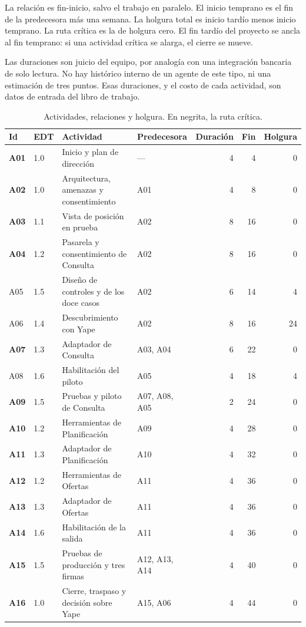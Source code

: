 \documentclass[11pt,a4paper]{article}
\begin{document}
La relación es fin-inicio, salvo el trabajo en paralelo. El inicio temprano es el fin de la predecesora más una semana. La holgura total es inicio tardío menos inicio temprano. La ruta crítica es la de holgura cero. El fin tardío del proyecto se ancla al fin temprano: si una actividad crítica se alarga, el cierre se mueve.

Las duraciones son juicio del equipo, por analogía con una integración bancaria de solo lectura. No hay histórico interno de un agente de este tipo, ni una estimación de tres puntos. Esas duraciones, y el costo de cada actividad, son datos de entrada del libro de trabajo.

\begin{table}[H]
\centering
\caption{Actividades, relaciones y holgura. En negrita, la ruta crítica.}
\footnotesize
\setlength{\tabcolsep}{3.5pt}
\begin{tabularx}{\textwidth}{@{}l l X l r r r@{}}
\toprule
\textbf{Id} & \textbf{EDT} & \textbf{Actividad} & \textbf{Predecesora} & \textbf{Duración} & \textbf{Fin} & \textbf{Holgura} \\
\midrule
\textbf{A01} & 1.0 & Inicio y plan de dirección & --- & 4 & 4 & 0 \\
\textbf{A02} & 1.0 & Arquitectura, amenazas y consentimiento & A01 & 4 & 8 & 0 \\
\textbf{A03} & 1.1 & Vista de posición en prueba & A02 & 8 & 16 & 0 \\
\textbf{A04} & 1.2 & Pasarela y consentimiento de Consulta & A02 & 8 & 16 & 0 \\
A05 & 1.5 & Diseño de controles y de los doce casos & A02 & 6 & 14 & 4 \\
A06 & 1.4 & Descubrimiento con Yape & A02 & 8 & 16 & 24 \\
\textbf{A07} & 1.3 & Adaptador de Consulta & A03, A04 & 6 & 22 & 0 \\
A08 & 1.6 & Habilitación del piloto & A05 & 4 & 18 & 4 \\
\textbf{A09} & 1.5 & Pruebas y piloto de Consulta & A07, A08, A05 & 2 & 24 & 0 \\
\textbf{A10} & 1.2 & Herramientas de Planificación & A09 & 4 & 28 & 0 \\
\textbf{A11} & 1.3 & Adaptador de Planificación & A10 & 4 & 32 & 0 \\
\textbf{A12} & 1.2 & Herramientas de Ofertas & A11 & 4 & 36 & 0 \\
\textbf{A13} & 1.3 & Adaptador de Ofertas & A11 & 4 & 36 & 0 \\
\textbf{A14} & 1.6 & Habilitación de la salida & A11 & 4 & 36 & 0 \\
\textbf{A15} & 1.5 & Pruebas de producción y tres firmas & A12, A13, A14 & 4 & 40 & 0 \\
\textbf{A16} & 1.0 & Cierre, traspaso y decisión sobre Yape & A15, A06 & 4 & 44 & 0 \\
\bottomrule
\end{tabularx}
\end{table}
\end{document}
